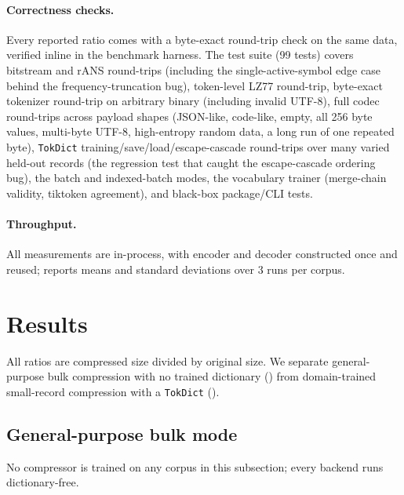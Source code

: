 \documentclass[10pt,twocolumn]{article}
\theoremstyle{plain}
\theoremstyle{definition}
\begin{document}
\paragraph{Correctness checks.} Every reported ratio comes with a byte-exact
round-trip check on the same data, verified inline in the benchmark harness. The test
suite (99 tests) covers bitstream and rANS round-trips (including the
single-active-symbol edge case behind the frequency-truncation bug), token-level LZ77
round-trip, byte-exact tokenizer round-trip on arbitrary binary (including invalid
UTF-8), full codec round-trips across payload shapes (JSON-like, code-like, empty, all
256 byte values, multi-byte UTF-8, high-entropy random data, a long run of one
repeated byte), \texttt{TokDict} training/save/load/escape-cascade round-trips over
many varied held-out records (the regression test that caught the escape-cascade
ordering bug), the batch and indexed-batch modes, the vocabulary trainer
(merge-chain validity, tiktoken agreement), and black-box package/CLI tests.

\paragraph{Throughput.} All measurements are in-process, with encoder and decoder
constructed once and reused;  reports means and standard deviations
over 3 runs per corpus.

\section{Results}\label{sec:results}

All ratios are compressed size divided by original size. We separate general-purpose
bulk compression with no trained dictionary () from domain-trained
small-record compression with a \texttt{TokDict} ().

\subsection{General-purpose bulk mode}\label{sec:bulk}

No compressor is trained on any corpus in this subsection; every backend runs
dictionary-free.
\end{document}
